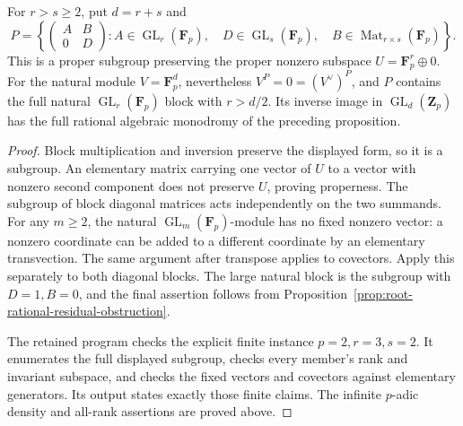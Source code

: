 \begin{example}
\label{ex:root-rational-residual-parabolic}
For \(r>s\ge2\), put \(d=r+s\) and
\[
 P=\left\{
  \begin{pmatrix} A&B\\0&D\end{pmatrix}:
  A\in\operatorname{GL}_r(\mathbf F_p),\quad
  D\in\operatorname{GL}_s(\mathbf F_p),\quad
  B\in\operatorname{Mat}_{r\times s}(\mathbf F_p)
 \right\}.
\]
This is a proper subgroup preserving the proper nonzero subspace
\(U=\mathbf F_p^r\oplus0\). For the natural module
\(V=\mathbf F_p^d\), nevertheless
\(V^P=0=(V^\vee)^P\), and \(P\) contains the full natural
\(\operatorname{GL}_r(\mathbf F_p)\) block with
\(r>d/2\). Its inverse image in
\(\operatorname{GL}_d(\mathbf Z_p)\) has the full rational
algebraic monodromy of the preceding proposition.
\end{example}
\begin{proof}
Block multiplication and inversion preserve the displayed form, so
it is a subgroup. An elementary matrix carrying one vector of \(U\)
to a vector with nonzero second component does not preserve \(U\),
proving properness. The subgroup of block diagonal matrices acts
independently on the two summands. For any \(m\ge2\), the natural
\(\operatorname{GL}_m(\mathbf F_p)\)-module has no fixed nonzero
vector: a nonzero coordinate can be added to a different coordinate
by an elementary transvection. The same argument after transpose
applies to covectors. Apply this separately to both diagonal blocks.
The large natural block is the subgroup with \(D=1,B=0\), and
the final assertion follows from
Proposition~\ref{prop:root-rational-residual-obstruction}.

The retained program
checks the explicit finite instance \(p=2,r=3,s=2\). It enumerates
the full displayed subgroup, checks every member's rank and invariant
subspace, and checks the fixed vectors and covectors against elementary
generators. Its output states exactly those finite claims. The
infinite \(p\)-adic density and all-rank assertions are proved above.
\end{proof}

